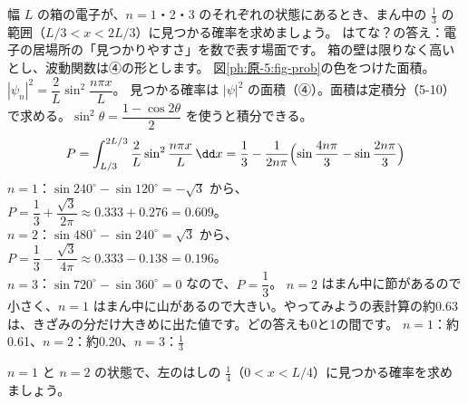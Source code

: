 \label{ph:原-5:ex3}
\begin{phreidai}
幅 $L$ の箱の電子が、$n=1$・2・3 のそれぞれの状態にあるとき、まん中の $\tfrac13$ の範囲（$L/3<x<2L/3$）に見つかる確率を求めましょう。
\phbamen
はてな？の答え：電子の居場所の「見つかりやすさ」を数で表す場面です。
\phmushi
箱の壁は限りなく高いとし、波動関数は④の形とします。
\phzu
図\ref{ph:原-5:fig-prob}の色をつけた面積。$|\psi_n|^2=\dfrac2L\sin^2\dfrac{n\pi x}{L}$。
\phriyu
見つかる確率は $|\psi|^2$ の面積（④）。面積は定積分（5-10）で求める。$\sin^2\theta=\dfrac{1-\cos2\theta}{2}$ を使うと積分できる。
\phtateru
\[P=\int_{L/3}^{2L/3}\frac2L\sin^2\frac{n\pi x}{L}\,\dd x=\frac13-\frac{1}{2n\pi}\Bigl(\sin\frac{4n\pi}{3}-\sin\frac{2n\pi}{3}\Bigr)\]
\phtoku
$n=1$：$\sin240^\circ-\sin120^\circ=-\sqrt3$ から、\\
\hspace*{2\zw}$P=\dfrac13+\dfrac{\sqrt3}{2\pi}\approx0.333+0.276=0.609$。\\
$n=2$：$\sin480^\circ-\sin240^\circ=\sqrt3$ から、\\
\hspace*{2\zw}$P=\dfrac13-\dfrac{\sqrt3}{4\pi}\approx0.333-0.138=0.196$。\\
$n=3$：$\sin720^\circ-\sin360^\circ=0$ なので、$P=\dfrac13$。
\phtashikame
$n=2$ はまん中に節があるので小さく、$n=1$ はまん中に山があるので大きい。やってみようの表計算の約0.63は、きざみの分だけ大きめに出た値です。どの答えも0と1の間です。
\kotae $n=1$：約0.61、$n=2$：約0.20、$n=3$：$\tfrac13$
\end{phreidai}
\begin{jibun}
$n=1$ と $n=2$ の状態で、左のはしの $\tfrac14$（$0<x<L/4$）に見つかる確率を求めましょう。
\end{jibun}

